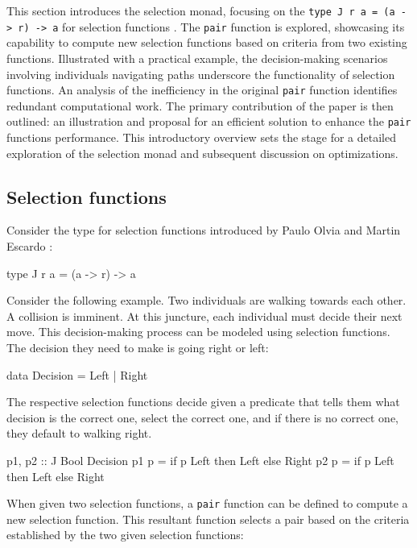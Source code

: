 \documentclass[runningheads]{llncs}
\begin{document}
This section introduces the selection monad, focusing on the
\texttt{type\ J\ r\ a\ =\ (a\ -\textgreater{}\ r)\ -\textgreater{}\ a}
for selection functions \cite{escardo2010selection}. The \texttt{pair}
function is explored, showcasing its capability to compute new selection
functions based on criteria from two existing functions. Illustrated
with a practical example, the decision-making scenarios involving
individuals navigating paths underscore the functionality of selection
functions. An analysis of the inefficiency in the original \texttt{pair}
function identifies redundant computational work. The primary
contribution of the paper is then outlined: an illustration and proposal
for an efficient solution to enhance the \texttt{pair} functions
performance. This introductory overview sets the stage for a detailed
exploration of the selection monad and subsequent discussion on
optimizations.

\subsection{Selection functions}\label{selection-functions}

Consider the type for selection functions introduced by Paulo Olvia and
Martin Escardo \cite{escardo2010selection} :

\begin{code}
type J r a = (a -> r) -> a
\end{code}

Consider the following example. Two individuals are walking towards each
other. A collision is imminent. At this juncture, each individual must
decide their next move. This decision-making process can be modeled
using selection functions. The decision they need to make is going right
or left:

\begin{code}
data Decision = Left | Right
\end{code}

The respective selection functions decide given a predicate that tells
them what decision is the correct one, select the correct one, and if
there is no correct one, they default to walking right.

\begin{code}
p1, p2 :: J Bool Decision
p1 p = if p Left then Left else Right
p2 p = if p Left then Left else Right
\end{code}

When given two selection functions, a \texttt{pair} function can be
defined to compute a new selection function. This resultant function
selects a pair based on the criteria established by the two given
selection functions:
\end{document}
